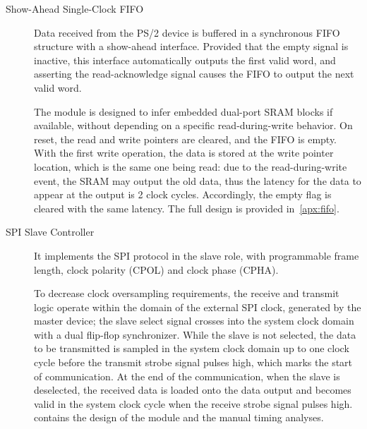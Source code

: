 \begin{description}
    \item[Show-Ahead Single-Clock FIFO] Data received from the PS/2 device is buffered in a synchronous FIFO structure with a show-ahead interface. Provided that the empty signal is inactive, this interface automatically outputs the first valid word, and asserting the read-acknowledge signal causes the FIFO to output the next valid word.

    The module is designed to infer embedded dual-port SRAM blocks if available, without depending on a specific read-during-write behavior. On reset, the read and write pointers are cleared, and the FIFO is empty. With the first write operation, the data is stored at the write pointer location, which is the same one being read: due to the read-during-write event, the SRAM may output the old data, thus the latency for the data to appear at the output is 2 clock cycles. Accordingly, the empty flag is cleared with the same latency. The full design is provided in~\cref{apx:fifo}.

    \item[SPI Slave Controller] It implements the SPI protocol in the slave role, with programmable frame length, clock polarity (CPOL) and clock phase (CPHA).

    To decrease clock oversampling requirements, the receive and transmit logic operate within the domain of the external SPI clock, generated by the master device; the slave select signal crosses into the system clock domain with a dual flip-flop synchronizer. While the slave is not selected, the data to be transmitted is sampled in the system clock domain up to one clock cycle before the transmit strobe signal pulses high, which marks the start of communication. At the end of the communication, when the slave is deselected, the received data is loaded onto the data output and becomes valid in the system clock cycle when the receive strobe signal pulses high.
     contains the design of the module and the manual timing analyses.
    
\end{description}

